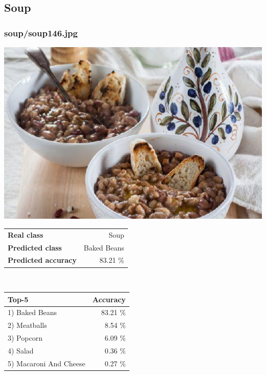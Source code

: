 \subsection{Soup}
    
\subsubsection{soup/soup146.jpg}

\begin{minipage}[t]{0.4\textwidth}
	\vspace{0pt}
	\includegraphics[width=\linewidth]{images/evaluation-images/soup/soup146.jpg}
\end{minipage}
\hfill
\begin{minipage}[t]{0.5\textwidth}
	\vspace{0pt}\raggedright
	\begin{tabularx}{\textwidth}{X r}
		\small \textbf{Real class} & \small Soup\\
		\small \textbf{Predicted class} & \small Baked Beans\\
		\small \textbf{Predicted accuracy} & \small 83.21 \%
    \end{tabularx}\\
    
    \vspace{6pt}
	\begin{tabularx}{\textwidth}{X r}
        \small \textbf{Top-5} & \small \textbf{Accuracy} \\
        \hline
		\small 1) Baked Beans & \small 83.21 \%\\\small 2) Meatballs & \small 8.54 \%\\\small 3) Popcorn & \small 6.09 \%\\\small 4) Salad & \small 0.36 \%\\\small 5) Macaroni And Cheese & \small 0.27 \%
    \end{tabularx}
\end{minipage}
    
